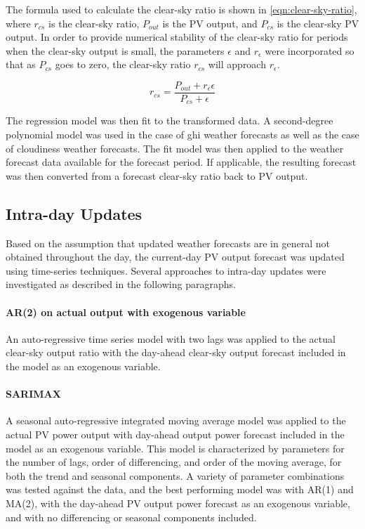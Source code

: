 The formula used to calculate the clear-sky ratio is shown in \cref{eqn:clear-sky-ratio},
where $r_{cs}$ is the clear-sky ratio, $P_{out}$ is the PV output, and $P_{cs}$ is the clear-sky PV output.
In order to provide numerical stability of the clear-sky ratio for periods when the clear-sky output is small, the parameters $\epsilon$ and $r_\epsilon$ were incorporated so that as $P_{cs}$ goes to zero, the clear-sky ratio $r_{cs}$ will approach $r_\epsilon$.

\begin{equation}
	\label{eqn:clear-sky-ratio}
	r_{cs} = \frac{P_{out} + r_\epsilon \epsilon}{P_{cs} + \epsilon}
\end{equation}

The regression model was then fit to the transformed data.
A second-degree polynomial model was used in the case of ghi weather forecasts as well as the case of cloudiness weather forecasts.
The fit model was then applied to the weather forecast data available for the forecast period.
If applicable, the resulting forecast was then converted from a forecast clear-sky ratio back to PV output.

\subsection{Intra-day Updates}

Based on the assumption that updated weather forecasts are in general not obtained throughout the day, the current-day PV output forecast was updated using time-series techniques. Several approaches to intra-day updates were investigated as described in the following paragraphs.

\paragraph{AR(2) on actual output with exogenous variable}
An auto-regressive time series model with two lags was applied to the actual clear-sky output ratio with the day-ahead clear-sky output forecast included in the model as an exogenous variable.

\paragraph{SARIMAX}
A seasonal auto-regressive integrated moving average model was applied to the actual PV power output with day-ahead output power forecast included in the model as an exogenous variable.
This model is characterized by parameters for the number of lags, order of differencing, and order of the moving average, for both the trend and seasonal components.
A variety of parameter combinations was tested against the data, and the best performing model was with AR(1) and MA(2), with the day-ahead PV output power forecast as an exogenous variable, and with no differencing or seasonal components included.

